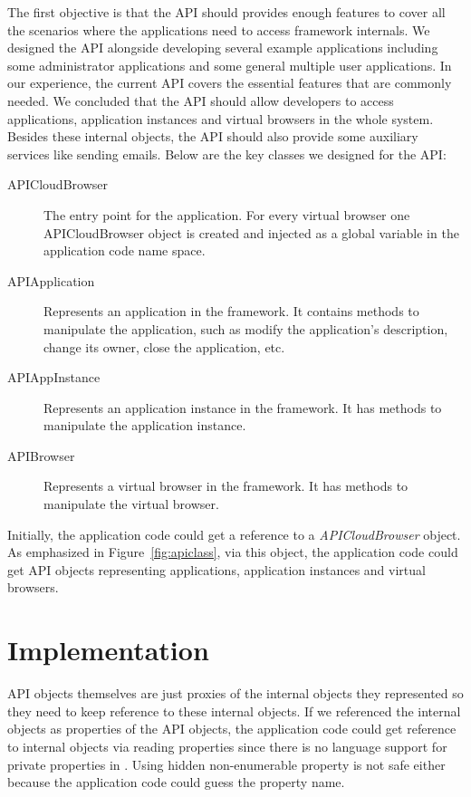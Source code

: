 The first objective is that the API should provides enough features to cover
all the scenarios where the applications need to access framework internals.
We designed the API alongside developing several example applications
including some administrator applications and some general multiple user
applications. In our experience, the current API covers the essential features
that are commonly needed. We concluded that the API should allow developers to
access applications, application instances and virtual browsers in the whole
system. Besides these internal objects, the API should also provide some
auxiliary services like sending emails. Below are the key classes we designed
for the API:

\begin{description}
\item[APICloudBrowser]
The entry point for the application.
For every virtual browser one APICloudBrowser object is created and injected as
a global variable in the application code name space.

\item[APIApplication] Represents an application in the framework.
It contains methods to manipulate the application, such as modify the application's
description, change its owner, close the application, etc.

\item[APIAppInstance] Represents an application instance in the framework.
It has methods to manipulate the application instance.

\item[APIBrowser] Represents a virtual browser in the framework.
It has methods to manipulate the virtual browser.

\end{description}

\apiclassfig{}

Initially, the application code could get a reference to a
\emph{APICloudBrowser} object. As emphasized in Figure~\ref{fig:apiclass}, via
this object, the application code could get API objects representing
applications, application instances and virtual browsers.


\section{Implementation}

API objects themselves are just proxies of the internal objects they
represented so they need to keep reference to these internal objects. If we
referenced the internal objects as properties of the API objects, the
application code could get reference to internal objects via reading
properties  since there is no language support for private properties in \js.
Using hidden non-enumerable property is not safe either because the
application code could guess the property name.

